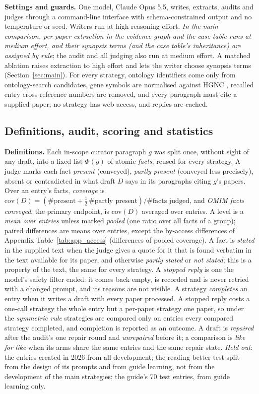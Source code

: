 \documentclass{article} %
\begin{document}
\textbf{Settings and guards.} One model, Claude Opus 5.5, writes, extracts, audits and judges through a command-line interface with schema-constrained output and no temperature or seed. Writers run at high reasoning effort. \emph{In the main comparison, per-paper extraction in the evidence graph and the case table runs at medium effort, and their synopsis terms (and the case table's inheritance) are assigned by rule}; the audit and all judging also run at medium effort. A matched ablation raises extraction to high effort and lets the writer choose synopsis terms (Section~\ref{sec:main}). For every strategy, ontology identifiers come only from ontology-search candidates, gene symbols are normalised against HGNC \citep{seal2023genenames}, recalled entry cross-reference numbers are removed, and every paragraph must cite a supplied paper; no strategy has web access, and replies are cached.

\subsection{Definitions, audit, scoring and statistics}
\label{sec:scoring}
\textbf{Definitions.} Each in-scope curator paragraph $g$ was split once, without sight of any draft, into a fixed list $\Phi(g)$ of atomic \emph{facts}, reused for every strategy. A judge marks each fact \emph{present} (conveyed), \emph{partly present} (conveyed less precisely), absent or contradicted in what draft $D$ says in its paragraphs citing $g$'s papers. Over an entry's facts, \emph{coverage} is $\mathrm{cov}(D)=(\#\text{present}+\tfrac12\,\#\text{partly present})/\#\text{facts judged}$, and \emph{OMIM facts conveyed}, the primary endpoint, is $\mathrm{cov}(D)$ averaged over entries. A level is a \emph{mean over entries} unless marked \emph{pooled} (one ratio over all facts of a group); paired differences are means over entries, except the by-access differences of Appendix Table~\ref{tab:app_access} (differences of pooled coverage). A fact is \emph{stated} in the supplied text when the judge gives a quote for it that is found verbatim in the text available for its paper, and otherwise \emph{partly stated} or \emph{not stated}; this is a property of the text, the same for every strategy. A \emph{stopped reply} is one the model's safety filter ended: it comes back empty, is recorded and is never retried with a changed prompt, and its reasons are not visible. A strategy \emph{completes} an entry when it writes a draft with every paper processed. A stopped reply costs a one-call strategy the whole entry but a per-paper strategy one paper, so under the \emph{symmetric rule} strategies are compared only on entries every compared strategy completed, and completion is reported as an outcome. A draft is \emph{repaired} after the audit's one repair round and \emph{unrepaired} before it; a comparison is \emph{like for like} when its arms share the same entries and the same repair state. \emph{Held out}: the entries created in 2026 from all development; the reading-better test split from the design of its prompts and from guide learning, not from the development of the main strategies; the guide's 70 test entries, from guide learning only.
\end{document}
